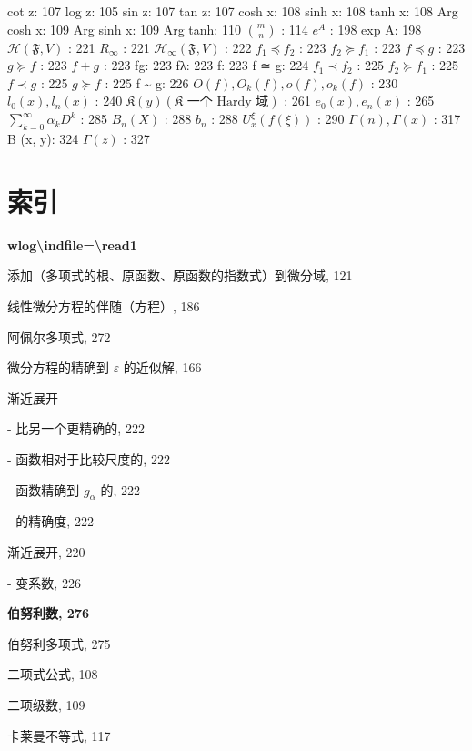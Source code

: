 cot z: 107 log z: 105 sin z: 107 tan z: 107 cosh x: 108 sinh x: 108 tanh x: 108 Arg cosh x: 109 Arg sinh x: 109 Arg tanh: 110 \(\binom{m}{n}\) : 114 \(e^{A}\) : 198 exp A: 198 \(\mathcal{H}(\mathfrak{F}, V)\) : 221 \(R_{\infty}\) : 221 \(\mathcal{H}_{\infty}(\mathfrak{F}, V)\) : 222 \(f_{1} \preccurlyeq f_{2}\) : 223 \(f_{2} \succcurlyeq f_{1}\) : 223 \(f \preccurlyeq g\) : 223 \(g \succcurlyeq f\) : 223 \(f + g\) : 223 fg: 223 fλ: 223 \textbar\textbar f\textbar\textbar: 223 f ≃ g: 224 \(f_{1} \prec f_{2}\) : 225 \(f_{2} \succcurlyeq f_{1}\) : 225 \(f \prec g\) : 225 \(g \succcurlyeq f\) : 225 f \textasciitilde{} g: 226 \(O(f), O_{k}(f), o(f), o_{k}(f)\) : 230 \(l_{0}(x), l_{n}(x)\) : 240 \(\mathfrak{K}(y) (\mathfrak{K} \text{ 一个 Hardy 域})\) : 261 \(e_{0}(x), e_{n}(x)\) : 265 \(\sum_{k=0}^{\infty} \alpha_{k} D^{k}\) : 285 \(B_{n}(X)\) : 288 \(b_{n}\) : 288 \(U_{x}^{\xi}(f(\xi))\) : 290 \(\Gamma(n), \Gamma(x)\) : 317 B (x, y): 324 \(\Gamma(z)\) : 327

\chapter*{索引}
{}

\par\noindent\textbf{\texorpdfstring{wlog\textbackslash indfile=\textbackslash read1}{wlog=}}\par

添加（多项式的根、原函数、原函数的指数式）到微分域, 121

线性微分方程的伴随（方程）, 186

阿佩尔多项式, 272

微分方程的精确到 \(\varepsilon\) 的近似解, 166

渐近展开

- 比另一个更精确的, 222

- 函数相对于比较尺度的, 222

- 函数精确到 \(g_{\alpha}\) 的, 222

- 的精确度, 222

渐近展开, 220

- 变系数, 226

\par\noindent\textbf{伯努利数, 276}\par

伯努利多项式, 275

二项式公式, 108

二项级数, 109

卡莱曼不等式, 117

